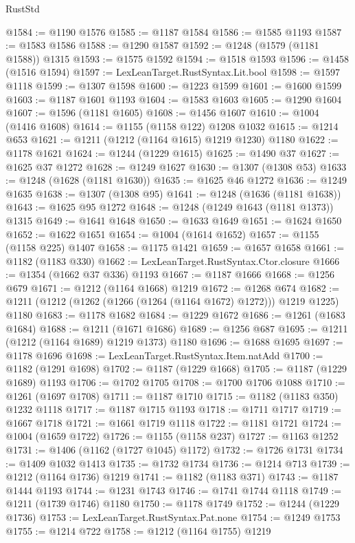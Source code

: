 \begin{lexlean}{RustStd}
\begin{coremodule}
@1584 := @1190 @1576
@1585 := @1187 @1584
@1586 := @1585 @1193
@1587 := @1583 @1586
@1588 := @1290 @1587
@1592 := @1248 (@1579 (@1181 @1588)) @1315
@1593 := @1575 @1592
@1594 := @1518 @1593
@1596 := @1458 (@1516 @1594)
@1597 := LexLeanTarget.RustSyntax.Lit.bool
@1598 := @1597 @1118
@1599 := @1307 @1598
@1600 := @1223 @1599
@1601 := @1600 @1599
@1603 := @1187 @1601 @1193
@1604 := @1583 @1603
@1605 := @1290 @1604
@1607 := @1596 (@1181 @1605)
@1608 := @1456 @1607
@1610 := @1004 (@1416 @1608)
@1614 := @1155 (@1158 @122) @1208 @1032
@1615 := @1214 @653
@1621 := @1211 (@1212 (@1164 @1615) @1219 @1230) @1180
@1622 := @1178 @1621
@1624 := @1244 (@1229 @1615)
@1625 := @1490 @37
@1627 := @1625 @37 @1272
@1628 := @1249 @1627
@1630 := @1307 (@1308 @53)
@1633 := @1248 (@1628 (@1181 @1630))
@1635 := @1625 @46 @1272
@1636 := @1249 @1635
@1638 := @1307 (@1308 @95)
@1641 := @1248 (@1636 (@1181 @1638))
@1643 := @1625 @95 @1272
@1648 := @1248 (@1249 @1643 (@1181 @1373)) @1315
@1649 := @1641 @1648
@1650 := @1633 @1649
@1651 := @1624 @1650
@1652 := @1622 @1651
@1654 := @1004 (@1614 @1652)
@1657 := @1155 (@1158 @225) @1407
@1658 := @1175 @1421
@1659 := @1657 @1658
@1661 := @1182 (@1183 @330)
@1662 := LexLeanTarget.RustSyntax.Ctor.closure
@1666 := @1354 (@1662 @37 @336) @1193
@1667 := @1187 @1666
@1668 := @1256 @679
@1671 := @1212 (@1164 @1668) @1219
@1672 := @1268 @674
@1682 := @1211 (@1212 (@1262 (@1266 (@1264 (@1164 @1672) @1272))) @1219 @1225) @1180
@1683 := @1178 @1682
@1684 := @1229 @1672
@1686 := @1261 (@1683 @1684)
@1688 := @1211 (@1671 @1686)
@1689 := @1256 @687
@1695 := @1211 (@1212 (@1164 @1689) @1219 @1373) @1180
@1696 := @1688 @1695
@1697 := @1178 @1696
@1698 := LexLeanTarget.RustSyntax.Item.natAdd
@1700 := @1182 (@1291 @1698)
@1702 := @1187 (@1229 @1668)
@1705 := @1187 (@1229 @1689) @1193
@1706 := @1702 @1705
@1708 := @1700 @1706 @1088
@1710 := @1261 (@1697 @1708)
@1711 := @1187 @1710
@1715 := @1182 (@1183 @350) @1232 @1118
@1717 := @1187 @1715 @1193
@1718 := @1711 @1717
@1719 := @1667 @1718
@1721 := @1661 @1719 @1118
@1722 := @1181 @1721
@1724 := @1004 (@1659 @1722)
@1726 := @1155 (@1158 @237)
@1727 := @1163 @1252
@1731 := @1406 (@1162 (@1727 @1045) @1172)
@1732 := @1726 @1731
@1734 := @1409 @1032 @1413
@1735 := @1732 @1734
@1736 := @1214 @713
@1739 := @1212 (@1164 @1736) @1219
@1741 := @1182 (@1183 @371)
@1743 := @1187 @1444 @1193
@1744 := @1231 @1743
@1746 := @1741 @1744 @1118
@1749 := @1211 (@1739 @1746) @1180
@1750 := @1178 @1749
@1752 := @1244 (@1229 @1736)
@1753 := LexLeanTarget.RustSyntax.Pat.none
@1754 := @1249 @1753
@1755 := @1214 @722
@1758 := @1212 (@1164 @1755) @1219

\end{coremodule}
\end{lexlean}
